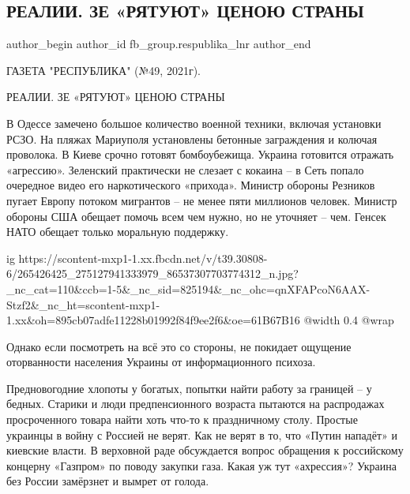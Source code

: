  
 
 
 
 
 
\subsection{РЕАЛИИ. ЗЕ «РЯТУЮТ» ЦЕНОЮ СТРАНЫ}
\label{sec:09_12_2021.fb.fb_group.respublika_lnr.2.ukraina_psihoz}
 
\ifcmt
 author_begin
   author_id fb_group.respublika_lnr
 author_end
\fi

ГАЗЕТА "РЕСПУБЛИКА" (№49, 2021г).

РЕАЛИИ. ЗЕ «РЯТУЮТ» ЦЕНОЮ СТРАНЫ

В Одессе замечено большое количество военной техники, включая установки РСЗО.
На пляжах Мариуполя установлены бетонные заграждения и колючая проволока. В
Киеве срочно готовят бомбоубежища. Украина готовится отражать «агрессию».
Зеленский практически не слезает с кокаина – в Сеть попало очередное видео его
наркотического «прихода». Министр обороны Резников пугает Европу потоком
мигрантов – не менее пяти миллионов человек. Министр обороны США обещает помочь
всем чем нужно, но не уточняет – чем. Генсек НАТО обещает только моральную
поддержку. 

\ifcmt
  ig https://scontent-mxp1-1.xx.fbcdn.net/v/t39.30808-6/265426425_275127941333979_86537307703774312_n.jpg?_nc_cat=110&ccb=1-5&_nc_sid=825194&_nc_ohc=qnXFAPcoN6AAX-Stzf2&_nc_ht=scontent-mxp1-1.xx&oh=895cb07adfe11228b01992f84f9ee2f6&oe=61B67B16
  @width 0.4
  @wrap 
\fi

Однако если посмотреть на всё это со стороны, не покидает ощущение оторванности
населения Украины от информационного психоза.

Предновогодние хлопоты у богатых, попытки найти работу за границей – у бедных.
Старики и люди предпенсионного возраста пытаются на распродажах просроченного
товара найти хоть что-то к праздничному столу. Простые украинцы в войну с
Россией не верят. Как не верят в то, что «Путин нападёт» и киевские власти. В
верховной раде обсуждается вопрос обращения к российскому концерну «Газпром» по
поводу закупки газа. Какая уж тут «ахрессия»? Украина без России замёрзнет и
вымрет от голода. 

